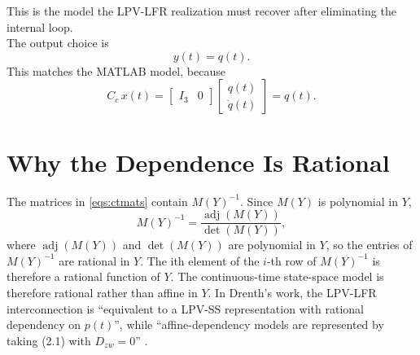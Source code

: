 \documentclass[11pt]{article}
\newcommand{\adj}{\operatorname{adj}}
\begin{document}
This is the model the LPV-LFR realization must recover after eliminating the internal loop.
\\
The output choice is
\begin{equation}
    y(t) = q(t).
    \label{eqs:yq}
\end{equation}
This matches the MATLAB model, because
\begin{equation}
    C_c\, x(t)
    =
    \begin{bmatrix} I_3 & 0 \end{bmatrix}
    \begin{bmatrix} q(t) \\ \dot{q}(t) \end{bmatrix}
    = q(t).
    \label{eqs:ccx}
\end{equation}

\section{Why the Dependence Is Rational}
The matrices in \eqref{eqs:ctmats} contain $M(Y)^{-1}$. Since $M(Y)$ is
polynomial in $Y$,
\begin{equation}
    M(Y)^{-1} = \frac{\adj(M(Y))}{\det(M(Y))},
    \label{eqs:adjdet}
\end{equation}
where $\adj(M(Y))$ and $\det(M(Y))$ are polynomial in $Y$, so the entries of
$M(Y)^{-1}$ are rational in $Y$. The ith element of the $i$-th row of $M(Y)^{-1}$ is therefore a rational function of $Y$. The continuous-time state-space model is therefore rational rather than affine
in $Y$. In Drenth's work, the LPV-LFR interconnection is ``equivalent to a
LPV-SS representation with rational dependency on $p(t)$'', while
``affine-dependency models are represented by taking (2.1) with $D_{zw}=0$''
\cite{drenth2025thesis}.
\end{document}
